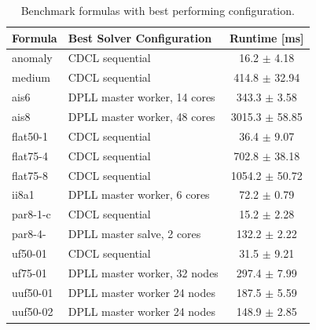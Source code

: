 \documentclass[letterpaper]{article}
\begin{document}
\begin{table}
    \centering
    \begin{tabular}{|l|l|c|}
        \hline
        Formula & Best Solver Configuration & Runtime [ms]\\
        \hline
        \hline
        anomaly & CDCL sequential & 16.2 $\pm$ 4.18 \\
        \hline
        medium & CDCL sequential & 414.8 $\pm$ 32.94 \\
        \hline
        ais6 & DPLL master worker, 14 cores & 343.3 $\pm$ 3.58 \\
        \hline
        ais8 & DPLL master worker, 48 cores & 3015.3 $\pm$ 58.85 \\
        \hline
        flat50-1 & CDCL sequential & 36.4 $\pm$ 9.07 \\
        \hline
        flat75-4 & CDCL sequential & 702.8 $\pm$ 38.18 \\
        \hline
        flat75-8 & CDCL sequential & 1054.2 $\pm$ 50.72 \\
        \hline
        ii8a1 & DPLL master worker, 6 cores & 72.2 $\pm$ 0.79 \\
        \hline
        par8-1-c & CDCL sequential & 15.2 $\pm$ 2.28 \\
        \hline
        par8-4- & DPLL master salve, 2 cores & 132.2 $\pm$ 2.22 \\
        \hline
        uf50-01 & CDCL sequential & 31.5 $\pm$ 9.21 \\
        \hline
        uf75-01 & DPLL master worker, 32 nodes & 297.4 $\pm$ 7.99 \\
        \hline
        uuf50-01 & DPLL master worker 24 nodes & 187.5 $\pm$ 5.59 \\
        \hline
        uuf50-02 & DPLL master worker 24 nodes & 148.9 $\pm$ 2.85 \\
        \hline
    \end{tabular}
    \caption{Benchmark formulas with best performing configuration.}
    \label{tab:cnfs_parallel}
\end{table}
\end{document}

